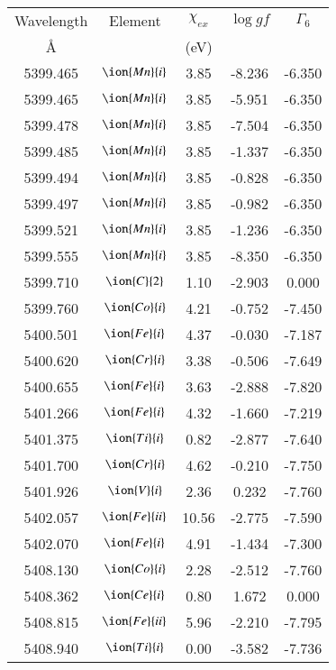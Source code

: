 \documentclass[fleqn,usenatbib]{mnras}
\begin{document}
 \begin{center}
 \begin{table}
 \begin{tabular}{ccccc}
 \hline
 Wavelength & Element & $\chi_{ex}$ &  $\log gf$ & $\varGamma_{6}$ \\
   \AA{}    &         &  (eV)       &            &                 \\
 \hline
5399.465 &  $\ion{Mn}{i}$  & 3.85 & -8.236 & -6.350 \\ 
5399.465 &  $\ion{Mn}{i}$  & 3.85 & -5.951 & -6.350 \\ 
5399.478 &  $\ion{Mn}{i}$  & 3.85 & -7.504 & -6.350 \\ 
5399.485 &  $\ion{Mn}{i}$  & 3.85 & -1.337 & -6.350 \\ 
5399.494 &  $\ion{Mn}{i}$  & 3.85 & -0.828 & -6.350 \\ 
5399.497 &  $\ion{Mn}{i}$  & 3.85 & -0.982 & -6.350 \\ 
5399.521 &  $\ion{Mn}{i}$  & 3.85 & -1.236 & -6.350 \\ 
5399.555 &  $\ion{Mn}{i}$  & 3.85 & -8.350 & -6.350 \\ 
5399.710 &  $\ion{C}{2}$ & 1.10 & -2.903 & 0.000 \\ 
5399.760 &  $\ion{Co}{i}$  & 4.21 & -0.752 & -7.450 \\ 
5400.501 &  $\ion{Fe}{i}$  & 4.37 & -0.030 & -7.187 \\ 
5400.620 &  $\ion{Cr}{i}$  & 3.38 & -0.506 & -7.649 \\ 
5400.655 &  $\ion{Fe}{i}$  & 3.63 & -2.888 & -7.820 \\ 
5401.266 &  $\ion{Fe}{i}$  & 4.32 & -1.660 & -7.219 \\ 
5401.375 &  $\ion{Ti}{i}$  & 0.82 & -2.877 & -7.640 \\ 
5401.700 &  $\ion{Cr}{i}$  & 4.62 & -0.210 & -7.750 \\ 
5401.926 &  $\ion{V}{i}$  & 2.36 & 0.232 & -7.760 \\ 
5402.057 &  $\ion{Fe}{ii}$  & 10.56 & -2.775 & -7.590 \\ 
5402.070 &  $\ion{Fe}{i}$  & 4.91 & -1.434 & -7.300 \\ 
5408.130 &  $\ion{Co}{i}$  & 2.28 & -2.512 & -7.760 \\ 
5408.362 &  $\ion{Ce}{i}$  & 0.80 & 1.672 & 0.000 \\ 
5408.815 &  $\ion{Fe}{ii}$  & 5.96 & -2.210 & -7.795 \\ 
5408.940 &  $\ion{Ti}{i}$  & 0.00 & -3.582 & -7.736 \\ 

\end{tabular}
\end{table}
\end{center}
\end{document}
